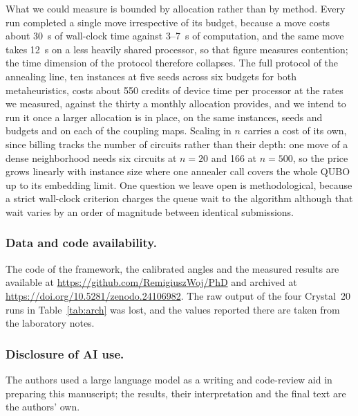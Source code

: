 \documentclass{svproc}
\newcommand{\doiurl}[1]{\mbox{\url{https://doi.org/#1}}}
\newif\ifblind
\newcommand{\rev}[1]{{\color{blue}#1}}
\newcommand{\rev}[1]{#1}
\begin{document}
What we could measure is bounded by allocation rather than by method. Every
run completed a single move irrespective of its budget, because a move costs
about \rev{30~s} of wall-clock time against \rev{3--7~s} of computation,
and the same move takes \rev{12~s} on a less heavily shared processor, so
that figure measures contention; the time dimension of the protocol therefore
collapses. The full protocol of the annealing line, ten instances at five
seeds across six budgets for both metaheuristics, costs about 550 credits of
device time per processor at the rates we measured, against the thirty a
monthly allocation provides, and we intend to run it once a larger allocation
is in place, on the same instances, seeds and budgets and on each of the
coupling maps. Scaling in $n$ carries a cost of its own, since billing tracks
the number of circuits rather than their depth: one move of a dense
neighborhood needs six circuits at $n=20$ and 166 at $n=500$, so the price
grows linearly with instance size where one annealer call covers the whole
QUBO up to its embedding limit. One question we leave open is methodological,
because a strict wall-clock criterion charges the queue wait to the algorithm
although that wait varies by an order of magnitude between identical
submissions.

\rev{\subsubsection{Data and code availability.}
The code of the framework, the calibrated angles and the measured results are
available at \url{https://github.com/RemigiuszWoj/PhD} and archived at
\doiurl{10.5281/zenodo.24106982}. The raw output of the
four Crystal~20 runs in Table~\ref{tab:arch} was lost, and the values reported
there are taken from the laboratory notes.}

\ifblind\else
\subsubsection{\rev{Disclosure of AI use.}}
The authors used a large language model as a writing and code-review aid in
preparing this manuscript; the results, their interpretation and the final
text are the authors' own.
\fi
\end{document}
